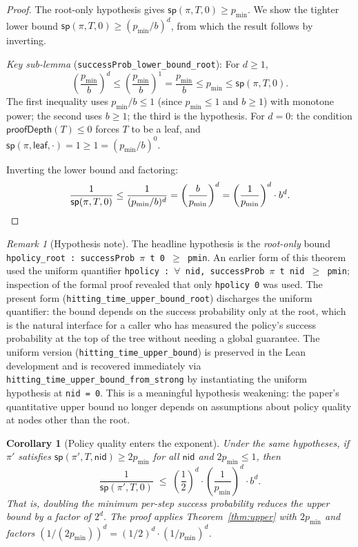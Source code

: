 \documentclass[reqno,11pt]{amsart}
\newcommand{\sP}{\mathsf{sp}}
\newcommand{\leafN}{\mathsf{leaf}}
\newcommand{\proofDepth}{\mathsf{proofDepth}}
\newcommand{\nid}{\mathsf{nid}}
\newcommand{\lean}[1]{\textup{\texttt{\small #1}}}
\theoremstyle{plain}
\newtheorem{corollary}[theorem]{Corollary}
\theoremstyle{definition}
\theoremstyle{remark}
\newtheorem{remark}[theorem]{Remark}
\begin{document}
\begin{proof}
The root-only hypothesis gives $\sP(\pi, T, 0) \ge p_{\min}$. We show the tighter lower bound $\sP(\pi, T, 0) \ge (p_{\min}/b)^d$, from which the result follows by inverting.

\emph{Key sub-lemma} (\lean{successProb\_lower\_bound\_root}): For $d \ge 1$,
\[
\left(\frac{p_{\min}}{b}\right)^d
\le \left(\frac{p_{\min}}{b}\right)^1
= \frac{p_{\min}}{b} \le p_{\min} \le \sP(\pi, T, 0).
\]
The first inequality uses $p_{\min}/b \le 1$ (since $p_{\min} \le 1$ and $b \ge 1$) with monotone power; the second uses $b \ge 1$; the third is the hypothesis. For $d = 0$: the condition $\proofDepth(T) \le 0$ forces $T$ to be a leaf, and $\sP(\pi, \leafN, \cdot) = 1 \ge 1 = (p_{\min}/b)^0$.

Inverting the lower bound and factoring:
\[
\frac{1}{\sP(\pi,T,0)} \le \frac{1}{(p_{\min}/b)^d} = \left(\frac{b}{p_{\min}}\right)^d = \left(\frac{1}{p_{\min}}\right)^d \cdot b^d. \qedhere
\]
\end{proof}

\begin{remark}[Hypothesis note]
The headline hypothesis is the \emph{root-only} bound \texttt{hpolicy\_root~:~successProb~$\pi$~t~0~$\ge$~pmin}. An earlier form of this theorem used the uniform quantifier \texttt{hpolicy~:~$\forall$~nid,~successProb~$\pi$~t~nid~$\ge$~pmin}; inspection of the formal proof revealed that only \texttt{hpolicy~0} was used. The present form (\lean{hitting\_time\_upper\_bound\_root}) discharges the uniform quantifier: the bound depends on the success probability only at the root, which is the natural interface for a caller who has measured the policy's success probability at the top of the tree without needing a global guarantee. The uniform version (\lean{hitting\_time\_upper\_bound}) is preserved in the Lean development and is recovered immediately via \lean{hitting\_time\_upper\_bound\_from\_strong} by instantiating the uniform hypothesis at \texttt{nid~=~0}. This is a meaningful hypothesis weakening: the paper's quantitative upper bound no longer depends on assumptions about policy quality at nodes other than the root.
\end{remark}

\begin{corollary}[Policy quality enters the exponent]\label{cor:policy-exp}
Under the same hypotheses, if $\pi'$ satisfies $\sP(\pi', T, \nid) \ge 2p_{\min}$ for all $\nid$ and $2p_{\min} \le 1$, then
\[
\frac{1}{\sP(\pi', T, 0)} \;\le\; \left(\frac{1}{2}\right)^d \cdot \left(\frac{1}{p_{\min}}\right)^d \cdot b^d.
\]
That is, doubling the minimum per-step success probability reduces the upper bound by a factor of $2^d$. The proof applies Theorem~\ref{thm:upper} with $2p_{\min}$ and factors $(1/(2p_{\min}))^d = (1/2)^d \cdot (1/p_{\min})^d$.
\end{corollary}
\end{document}
